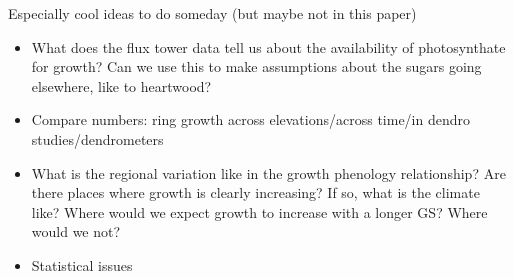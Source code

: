 \documentclass[11pt,letter]{article}
\begin{document}
Especially cool ideas to do someday (but maybe not in this paper)
\begin{itemize}
\item What does the flux tower data tell us about the availability of photosynthate for growth? Can we use this to make assumptions about the sugars going elsewhere, like to heartwood?
\item Compare numbers: ring growth across elevations/across time/in dendro studies/dendrometers
\item What is the regional variation like in the growth phenology relationship? Are there places where growth is clearly increasing? If so, what is the climate like? Where would we expect growth to increase with a longer GS? Where would we not?
\item Statistical issues
\end{itemize}
\end{document}
